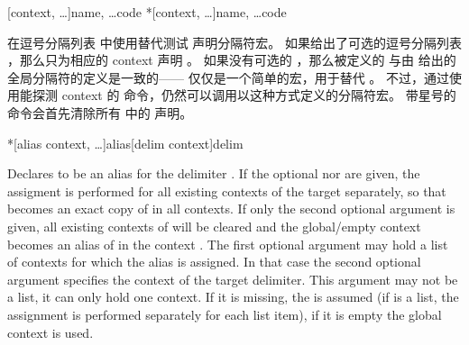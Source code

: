 \begin{ltxsyntax}
[context, \dots]{name, \dots}{code}
*[context, \dots]{name, \dots}{code}


在逗号分隔列表  中使用替代测试  声明分隔符宏。
如果给出了可选的逗号分隔列表 ，那么只为相应的 context 声明 。
如果没有可选的 ，那么被定义的  与由  给出的全局分隔符的定义是一致的——
仅仅是一个简单的宏，用于替代 。
不过，通过使用能探测 context 的  命令，仍然可以调用以这种方式定义的分隔符宏。
带星号的命令会首先清除所有  中的  声明。

*[alias context, \dots]{alias}[delim context]{delim}


Declares  to be an alias for the delimiter . If the optional  nor  are given, the assigment is performed for all existing contexts of the target  separately, so that  becomes an exact copy of  in all contexts. If only the second optional argument  is given, all existing contexts of  will be cleared and the global/empty context becomes an alias of  in the context . The first optional argument  may hold a list of contexts for which the alias is assigned. In that case the second optional argument  specifies the context of the target delimiter. This argument may not be a list, it can only hold one context. If it is missing, the  is assumed (if  is a list, the assignment is performed separately for each list item), if it is empty the global context is used.




\end{ltxsyntax}
